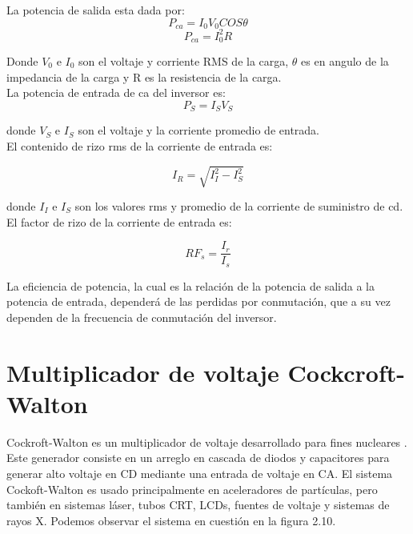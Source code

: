 La potencia de salida esta dada por: \begin{equation}
P_{ca}=I_{0}V_{0}COS\theta
\end{equation}
\begin{equation}
P_{ca}= I_{0}^{2}R
\end{equation}

Donde $V_{0}$ e $I_{0}$ son el voltaje y corriente RMS de la carga, $\theta$ es en angulo de la impedancia de la carga y R es la resistencia de la carga.\\

La potencia de entrada de ca del inversor es:\\

\begin{equation}
P_{S}=I_{S}V_{S}
\end{equation}

donde $V_{S}$ e $I_{S}$ son el voltaje y la corriente promedio de entrada.\\

El contenido de rizo rms de la corriente de entrada es:

\begin{equation}
I_{R}=\sqrt{I_{I}^{2}-I_{S}^{2}}
\end{equation}

donde $I_{I}$ e $I_{S}$ son los valores rms y promedio de la corriente de suministro de cd.
El factor de rizo de la corriente de entrada es: 

\begin{equation}
RF_{s}=\dfrac{I_{r}}{I_{s}}
\end{equation}

La eficiencia de potencia, la cual es la relación de la potencia de salida a la potencia de entrada, dependerá de las perdidas por conmutación, que a su vez dependen de la frecuencia de conmutación del inversor.\\

 
\newpage
\section{Multiplicador de voltaje Cockcroft-Walton}
Cockroft-Walton es un multiplicador de voltaje desarrollado para fines nucleares \cite{CERN}. Este generador consiste en un arreglo en cascada de diodos y capacitores para generar alto voltaje en CD mediante una entrada de voltaje en CA. El sistema Cockoft-Walton es usado principalmente en aceleradores de partículas, pero también en sistemas láser, tubos CRT, LCDs, fuentes de voltaje y sistemas de rayos X. Podemos observar el sistema en cuestión en la figura 2.10.  

